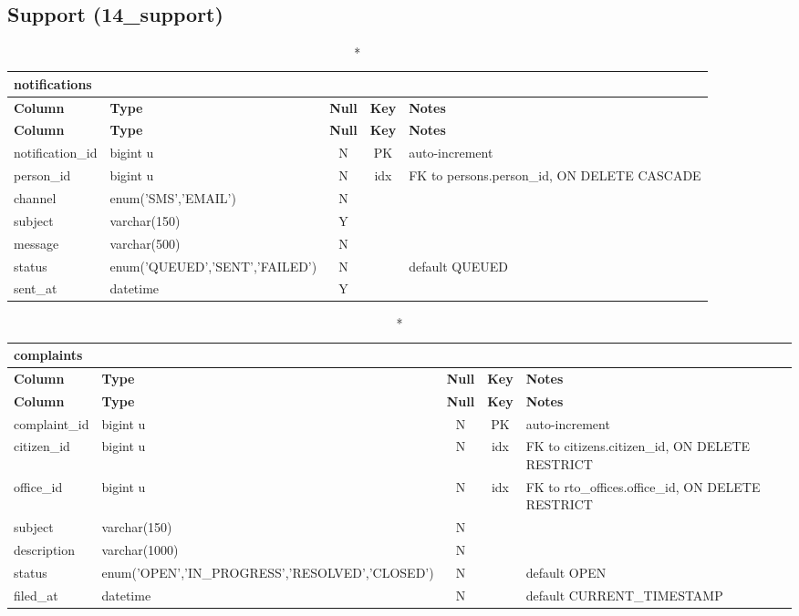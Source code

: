 \subsection*{Support (14\_support)}
\begin{longtable}{@{}p{3.4cm}p{2.9cm}c c p{5.6cm}@{}}
\caption*{\textbf{notifications}}\\
\toprule \textbf{Column} & \textbf{Type} & \textbf{Null} & \textbf{Key} & \textbf{Notes} \\ \midrule \endfirsthead
\toprule \textbf{Column} & \textbf{Type} & \textbf{Null} & \textbf{Key} & \textbf{Notes} \\ \midrule \endhead
\bottomrule \endlastfoot
notification\_\allowbreak{}id & bigint u & N & PK & auto-increment \\
person\_\allowbreak{}id & bigint u & N & idx & FK to persons.person\_\allowbreak{}id, ON DELETE CASCADE \\
channel & enum('SMS',\allowbreak{}'EMAIL') & N &  &  \\
subject & varchar(150) & Y &  &  \\
message & varchar(500) & N &  &  \\
status & enum('QUEUED',\allowbreak{}'SENT',\allowbreak{}'FAILED') & N &  & default QUEUED \\
sent\_\allowbreak{}at & datetime & Y &  &  \\
\end{longtable}
\vspace{-0.4em}
\begin{longtable}{@{}p{3.4cm}p{2.9cm}c c p{5.6cm}@{}}
\caption*{\textbf{complaints}}\\
\toprule \textbf{Column} & \textbf{Type} & \textbf{Null} & \textbf{Key} & \textbf{Notes} \\ \midrule \endfirsthead
\toprule \textbf{Column} & \textbf{Type} & \textbf{Null} & \textbf{Key} & \textbf{Notes} \\ \midrule \endhead
\bottomrule \endlastfoot
complaint\_\allowbreak{}id & bigint u & N & PK & auto-increment \\
citizen\_\allowbreak{}id & bigint u & N & idx & FK to citizens.citizen\_\allowbreak{}id, ON DELETE RESTRICT \\
office\_\allowbreak{}id & bigint u & N & idx & FK to rto\_\allowbreak{}offices.office\_\allowbreak{}id, ON DELETE RESTRICT \\
subject & varchar(150) & N &  &  \\
description & varchar(1000) & N &  &  \\
status & enum('OPEN',\allowbreak{}'IN\_\allowbreak{}PROGRESS',\allowbreak{}'RESOLVED',\allowbreak{}'CLOSED') & N &  & default OPEN \\
filed\_\allowbreak{}at & datetime & N &  & default CURRENT\_\allowbreak{}TIMESTAMP \\
\end{longtable}
